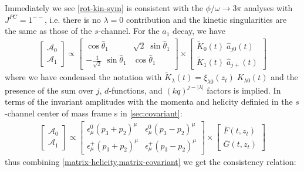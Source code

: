 \documentclass[10pt, aps,prd,amsmath,amssymb,superscriptaddress,onecolumn,
nofootinbib,showpacs,preprintnumbers]{revtex4-1}
\begin{document}
Immediately we see \cref{rot-kin-sym} is consistent with the \(\phi/\omega \to 3\pi\) analyses \cite{Danilkin:2014cra,Niecknig:2012sj} with \(J^{PC} = 1^{--}\), i.e. there is no \(\lambda = 0\) contribution and the kinetic singularities are the same as those of the \(s\)-channel. For the \(a_1\) decay, we have
  \begin{align} \label{matrix-helicity}
    \begin{bmatrix}
    \mathcal{A}_0 \\
    \mathcal{A}_1
    \end{bmatrix}
    \propto
    \begin{bmatrix}
        \cos \hat{\theta}_1  &  \sqrt{2} \; \sin \hat{\theta}_1   \\
       - \frac{1}{\sqrt{2}}  \; \sin \hat{\theta}_1  & \cos \hat{\theta}_1
    \end{bmatrix}
    \times
    \begin{bmatrix}
       \tilde{K}_{0}(t) \; \hat{a}_{j0}(t) \\
     \tilde{K}_{1}(t) \;   \hat{a}_{j+}(t)
    \end{bmatrix}
  \end{align}
where we have condensed the notation with \(\tilde{K}_\lambda(t) = \xi_{\lambda0}(z_t) \; K_{\lambda0}(t)\) and the presence of the sum over \(j\), \(d\)-functions, and \((kq)^{j-|\lambda|}\) factors is implied. In terms of the invariant amplitudes with the momenta and helicity definied in the \(s\)-channel center of mass frame s in \cref{sec:covariant}:
  \begin{align} \label{matrix-covariant}
    \begin{bmatrix}
    \mathcal{A}_0 \\
    \mathcal{A}_1
    \end{bmatrix}
    \propto
    \begin{bmatrix}
      \epsilon_\mu^0 (p_3 + p_2)^\mu & \epsilon_\mu^0 (p_3 - p_2)^\mu \\
    \epsilon_\mu^+  (p_3 + p_2)^\mu & \epsilon_\mu^+ (p_3 - p_2)^\mu
    \end{bmatrix}
    \times
    \begin{bmatrix}
      \bar{F}(t,z_t) \\
       \bar{G}(t,z_t)
    \end{bmatrix}
  \end{align}
thus combining \cref{matrix-helicity,matrix-covariant} we get the consistency relation:
\end{document}
